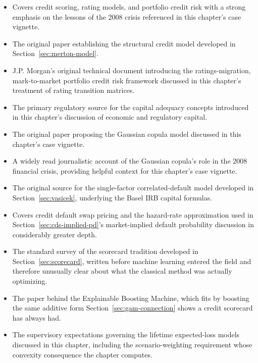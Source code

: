 \documentclass[../ai_in_finance]{subfiles}
\begin{document}
\begin{itemize}
    \item {} Covers credit scoring, rating models, and portfolio credit risk with a strong emphasis on the lessons of the 2008 crisis referenced in this chapter's case vignette.
    \item {} The original paper establishing the structural credit model developed in Section~\ref{sec:merton-model}.
    \item {} J.P. Morgan's original technical document introducing the ratings-migration, mark-to-market portfolio credit risk framework discussed in this chapter's treatment of rating transition matrices.
    \item {} The primary regulatory source for the capital adequacy concepts introduced in this chapter's discussion of economic and regulatory capital.
    \item {} The original paper proposing the Gaussian copula model discussed in this chapter's case vignette.
    \item {} A widely read journalistic account of the Gaussian copula's role in the 2008 financial crisis, providing helpful context for this chapter's case vignette.
    \item {} The original source for the single-factor correlated-default model developed in Section~\ref{sec:vasicek}, underlying the Basel IRB capital formulas.
    \item {} Covers credit default swap pricing and the hazard-rate approximation used in Section~\ref{sec:cds-implied-pd}'s market-implied default probability discussion in considerably greater depth.
    \item {} The standard survey of the scorecard tradition developed in Section~\ref{sec:scorecard}, written before machine learning entered the field and therefore unusually clear about what the classical method was actually optimizing.
    \item {} The paper behind the Explainable Boosting Machine, which fits by boosting the same additive form Section~\ref{sec:gam-connection} shows a credit scorecard has always had.
    \item {} The supervisory expectations governing the lifetime expected-loss models discussed in this chapter, including the scenario-weighting requirement whose convexity consequence the chapter computes.

\end{itemize}
\end{document}
